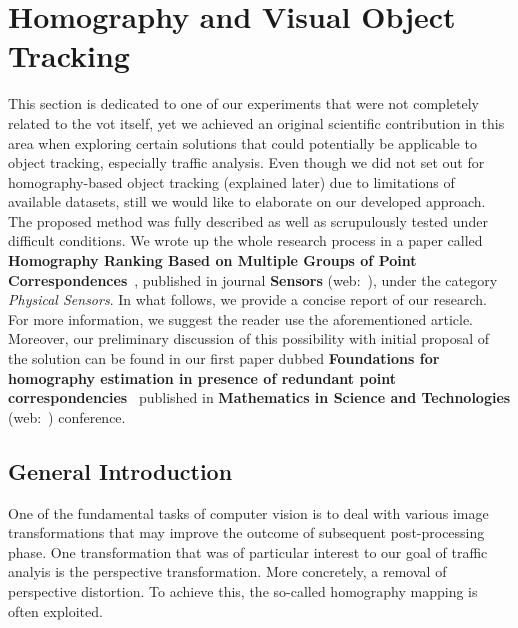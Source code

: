 \section{Homography and Visual Object Tracking}
\label{sec:HomographyAndVisualObjectTracking}

This section is dedicated to one of our experiments that were not completely related to the \gls{vot} itself, yet we achieved an original scientific contribution in this area when exploring certain solutions that could potentially be applicable to object tracking, especially traffic analysis. Even though we did not set out for homography-based object tracking (explained later) due to limitations of available datasets, still we would like to elaborate on our developed approach. The proposed method was fully described as well as scrupulously tested under difficult conditions. We wrote up the whole research process in a paper called \textbf{Homography Ranking Based on Multiple Groups of Point Correspondences}~\cite{ondrasovic2021homography}, published in journal \textbf{Sensors} (web:~\cite{sensors}), under the category \emph{Physical Sensors}. In what follows, we provide a concise report of our research. For more information, we suggest the reader use the aforementioned article. Moreover, our preliminary discussion of this possibility with initial proposal of the solution can be found in our first paper dubbed \textbf{Foundations for homography estimation in presence of redundant point correspondencies}~\cite{ondravsovivc2020foundations} published in \textbf{Mathematics in Science and Technologies} (web:~\cite{mistconf}) conference.

\subsection{General Introduction}

One of the fundamental tasks of computer vision is to deal with various image transformations that may improve the outcome of subsequent post-processing phase. One transformation that was of particular interest to our goal of traffic analyis is the perspective transformation. More concretely, a removal of perspective distortion. To achieve this, the so-called homography mapping is often exploited.

